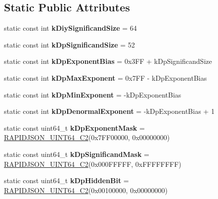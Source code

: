 \subsection*{Static Public Attributes}
\begin{DoxyCompactItemize}
\item 
\mbox{\label{a02252_aac30e0c32d43425ac403281fc9b0cee4}} 
static const int {\bfseries k\+Diy\+Significand\+Size} = 64
\item 
\mbox{\label{a02252_a037aed0fa0b66af0a13657418edef19e}} 
static const int {\bfseries k\+Dp\+Significand\+Size} = 52
\item 
\mbox{\label{a02252_a38b6f864ae0859d43fa96c3ff27959be}} 
static const int {\bfseries k\+Dp\+Exponent\+Bias} = 0x3\+F\+F + k\+Dp\+Significand\+Size
\item 
\mbox{\label{a02252_a80535a5594dae96fc482757a54162c7d}} 
static const int {\bfseries k\+Dp\+Max\+Exponent} = 0x7\+F\+F -\/ k\+Dp\+Exponent\+Bias
\item 
\mbox{\label{a02252_a9ad1b0cdbab318e45d2bc48e64707ef3}} 
static const int {\bfseries k\+Dp\+Min\+Exponent} = -\/k\+Dp\+Exponent\+Bias
\item 
\mbox{\label{a02252_a994f16a1247a290cfc3a875715e3a92b}} 
static const int {\bfseries k\+Dp\+Denormal\+Exponent} = -\/k\+Dp\+Exponent\+Bias + 1
\item 
\mbox{\label{a02252_aaacbf068c44275f4451db750938bd1d3}} 
static const uint64\+\_\+t {\bfseries k\+Dp\+Exponent\+Mask} = \hyperlink{a00560_aaee1245f375a71be1ac9b8a07ba5fb8f}{R\+A\+P\+I\+D\+J\+S\+O\+N\+\_\+\+U\+I\+N\+T64\+\_\+\+C2}(0x7\+F\+F00000, 0x00000000)
\item 
\mbox{\label{a02252_a841ef0ae29ccd2889e7f96aad76b0179}} 
static const uint64\+\_\+t {\bfseries k\+Dp\+Significand\+Mask} = \hyperlink{a00560_aaee1245f375a71be1ac9b8a07ba5fb8f}{R\+A\+P\+I\+D\+J\+S\+O\+N\+\_\+\+U\+I\+N\+T64\+\_\+\+C2}(0x000\+F\+F\+F\+F\+F, 0x\+F\+F\+F\+F\+F\+F\+F\+F)
\item 
\mbox{\label{a02252_a43ea451ce20095b1ff53cccf132ca15f}} 
static const uint64\+\_\+t {\bfseries k\+Dp\+Hidden\+Bit} = \hyperlink{a00560_aaee1245f375a71be1ac9b8a07ba5fb8f}{R\+A\+P\+I\+D\+J\+S\+O\+N\+\_\+\+U\+I\+N\+T64\+\_\+\+C2}(0x00100000, 0x00000000)
\end{DoxyCompactItemize}


